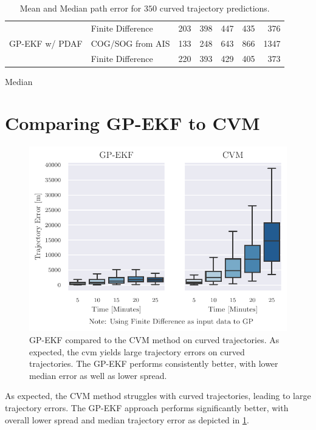 \begin{table}[h]
\begin{subtable}{\textwidth}
{\begin{tabular}{llrrrrr}
                               & Finite Difference & 203 & 398 & 447  & 435  & 376  \\
                GP-EKF w/ PDAF & COG/SOG from AIS  & 133 & 248 & 643  & 866  & 1347 \\
                               & Finite Difference & 220 & 393 & 429  & 405  & 373  \\
                \bottomrule
            \end{tabular}
        }
        \caption{Median}
    \end{subtable}
    \caption{Mean and Median path error for $350$ curved trajectory predictions.}
    \label{table:stats_curved_trajectory_path_err}
\end{table}

\section{Comparing GP-EKF to CVM}
\begin{figure}[h]
    \centering
    \includegraphics{figures/curved_line_stats/gp_vs_cvm_2.pdf}
    \caption{GP-EKF compared to the CVM method on curved trajectories. As expected, the \acrshort{cvm} yields large trajectory errors on curved trajectories. The GP-EKF performs consistently better, with lower median error as well as lower spread.}
    \label{fig:stats_curved_gp_ekf_cvm}
\end{figure}
As expected, the CVM method struggles with curved trajectories, leading to large trajectory errors. The GP-EKF approach performs significantly better, with overall lower spread and median trajectory error as depicted in \cref{fig:stats_curved_gp_ekf_cvm}.

